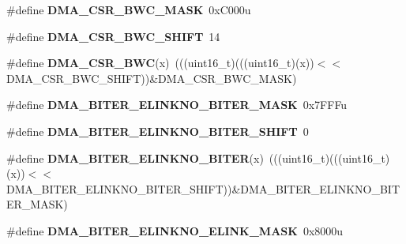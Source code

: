 \begin{DoxyCompactItemize}
\item 
\#define {\bfseries D\+M\+A\+\_\+\+C\+S\+R\+\_\+\+B\+W\+C\+\_\+\+M\+A\+SK}~0x\+C000u\hypertarget{group__DMA__Register__Masks_ga1ff3a4e1294d6ea9b00b675241d79a60}{}\label{group__DMA__Register__Masks_ga1ff3a4e1294d6ea9b00b675241d79a60}

\item 
\#define {\bfseries D\+M\+A\+\_\+\+C\+S\+R\+\_\+\+B\+W\+C\+\_\+\+S\+H\+I\+FT}~14\hypertarget{group__DMA__Register__Masks_gaf5c958b45ed9544b9877d50b330f2115}{}\label{group__DMA__Register__Masks_gaf5c958b45ed9544b9877d50b330f2115}

\item 
\#define {\bfseries D\+M\+A\+\_\+\+C\+S\+R\+\_\+\+B\+WC}(x)~(((uint16\+\_\+t)(((uint16\+\_\+t)(x))$<$$<$D\+M\+A\+\_\+\+C\+S\+R\+\_\+\+B\+W\+C\+\_\+\+S\+H\+I\+FT))\&D\+M\+A\+\_\+\+C\+S\+R\+\_\+\+B\+W\+C\+\_\+\+M\+A\+SK)\hypertarget{group__DMA__Register__Masks_gabf096c1882a693d928756d1dbaba8ece}{}\label{group__DMA__Register__Masks_gabf096c1882a693d928756d1dbaba8ece}

\item 
\#define {\bfseries D\+M\+A\+\_\+\+B\+I\+T\+E\+R\+\_\+\+E\+L\+I\+N\+K\+N\+O\+\_\+\+B\+I\+T\+E\+R\+\_\+\+M\+A\+SK}~0x7\+F\+F\+Fu\hypertarget{group__DMA__Register__Masks_gae018437bb5b22efe7ef42c909c0ddc3e}{}\label{group__DMA__Register__Masks_gae018437bb5b22efe7ef42c909c0ddc3e}

\item 
\#define {\bfseries D\+M\+A\+\_\+\+B\+I\+T\+E\+R\+\_\+\+E\+L\+I\+N\+K\+N\+O\+\_\+\+B\+I\+T\+E\+R\+\_\+\+S\+H\+I\+FT}~0\hypertarget{group__DMA__Register__Masks_gac759c623fdfd96b0bb47471802d9dba8}{}\label{group__DMA__Register__Masks_gac759c623fdfd96b0bb47471802d9dba8}

\item 
\#define {\bfseries D\+M\+A\+\_\+\+B\+I\+T\+E\+R\+\_\+\+E\+L\+I\+N\+K\+N\+O\+\_\+\+B\+I\+T\+ER}(x)~(((uint16\+\_\+t)(((uint16\+\_\+t)(x))$<$$<$D\+M\+A\+\_\+\+B\+I\+T\+E\+R\+\_\+\+E\+L\+I\+N\+K\+N\+O\+\_\+\+B\+I\+T\+E\+R\+\_\+\+S\+H\+I\+FT))\&D\+M\+A\+\_\+\+B\+I\+T\+E\+R\+\_\+\+E\+L\+I\+N\+K\+N\+O\+\_\+\+B\+I\+T\+E\+R\+\_\+\+M\+A\+SK)\hypertarget{group__DMA__Register__Masks_ga380cdfa3ebd8d6413ebefa25de22b4de}{}\label{group__DMA__Register__Masks_ga380cdfa3ebd8d6413ebefa25de22b4de}

\item 
\#define {\bfseries D\+M\+A\+\_\+\+B\+I\+T\+E\+R\+\_\+\+E\+L\+I\+N\+K\+N\+O\+\_\+\+E\+L\+I\+N\+K\+\_\+\+M\+A\+SK}~0x8000u\hypertarget{group__DMA__Register__Masks_ga3ae8b9da1a0c899d39608bc0b92ddd43}{}\label{group__DMA__Register__Masks_ga3ae8b9da1a0c899d39608bc0b92ddd43}


\end{DoxyCompactItemize}
